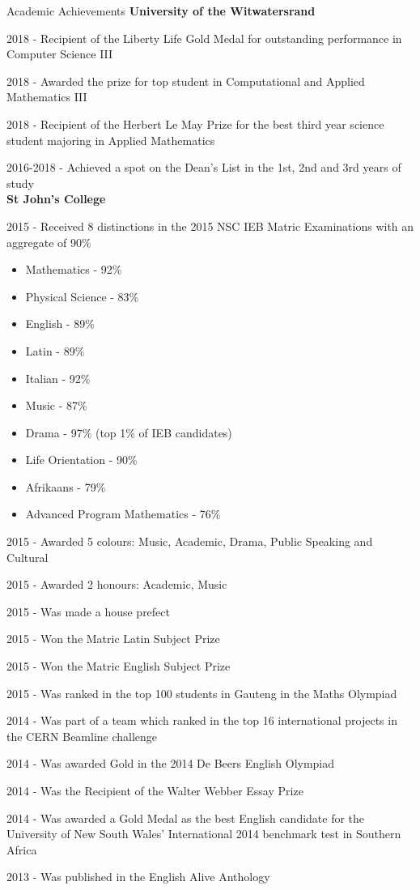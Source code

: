 \documentclass{resume} %
\begin{document}
\begin{rSection}{Academic Achievements} 
{\bf University of the Witwatersrand}
\item 2018 - Recipient of the Liberty Life Gold Medal for outstanding performance in Computer Science III
\item 2018 - Awarded the prize for top student in Computational and Applied Mathematics III
\item 2018 - Recipient of the Herbert Le May Prize for the best third year science student majoring in Applied Mathematics
\item 2016-2018 - Achieved a spot on the Dean's List in the 1st, 2nd and 3rd years of study
\\{\bf St John's College}
\item 2015 - Received 8 distinctions in the 2015 NSC IEB Matric Examinations with an aggregate of 90\%
\begin{itemize}
  \item Mathematics - 92\%
  \item Physical Science  - 83\%
  \item English - 89\%
  \item Latin - 89\%
  \item Italian - 92\%
  \item Music - 87\%
  \item Drama - 97\% (top 1\% of IEB candidates)
  \item Life Orientation - 90\%
  \item Afrikaans - 79\%
  \item Advanced Program Mathematics - 76\%
\end{itemize}
\item 2015 - Awarded 5 colours: Music, Academic, Drama, Public Speaking and Cultural
\item 2015 - Awarded 2 honours: Academic, Music
\item 2015 - Was made a house prefect
\item 2015 - Won the Matric Latin Subject Prize
\item 2015 - Won the Matric English Subject Prize
\item 2015 - Was ranked in the top 100 students in Gauteng in the Maths Olympiad
\item 2014 - Was part of a team which ranked in the top 16 international projects in the CERN Beamline challenge
\item 2014 - Was awarded Gold in the 2014 De Beers English Olympiad 
\item 2014 - Was the Recipient of the Walter Webber Essay Prize 
\item 2014 - Was awarded a Gold Medal as the best English candidate for the University of New South Wales’ International 2014 benchmark test in Southern Africa
\item 2013 - Was published in the English Alive Anthology
\end{rSection}
\end{document}
